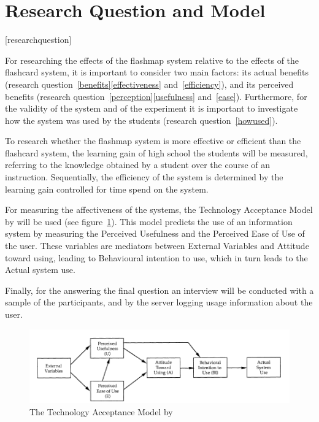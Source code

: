 \section{Research Question and Model}
\renewcommand{\theresearchquestion}{\Roman{researchquestion}}
[researchquestion]
\renewcommand{\thesubquestion}{\alph{subquestion}}



For researching the effects of the flashmap system relative to the effects of the flashcard system, it is important to consider two main factors: its actual benefits (research question~\ref{benefits}\ref{effectiveness} and~\ref{efficiency}), and its perceived benefits (research question~\ref{perception}\ref{usefulness} and~\ref{ease}). Furthermore, for the validity of the system and of the experiment it is important to investigate how the system was used by the students (research question~\ref{howused}).

To research whether the flashmap system is more effective or efficient than the flashcard system, the learning gain of high school the students will be measured, referring to the knowledge obtained by a student over the course of an instruction. Sequentially, the efficiency of the system is determined by the learning gain controlled for time spend on the system.

For measuring the affectiveness of the systems, the Technology Acceptance Model by  will be used (see figure~\ref{fig:tam}). This model predicts the use of an information system by measuring the Perceived Usefulness and the Perceived Ease of Use of the user. These variables are mediators between External Variables and Attitude toward using, leading to Behavioural intention to use, which in turn leads to the Actual system use.

Finally, for the answering the final question an interview will be conducted with a sample of the participants, and by the server logging usage information about the user.

\begin{figure}
    \centering
    \includegraphics[width=\textwidth]{img/tam}
    \caption{The Technology Acceptance Model by \protect{}}
    \label{fig:tam}
\end{figure}

